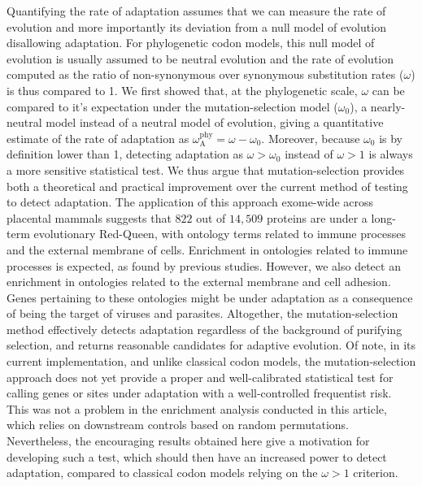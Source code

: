 \documentclass[9pt,twocolumn,twoside,lineno]{pnas-new}
\newcommand{\rateApop}{\omega_{\mathrm{A}}}
\newcommand{\rateAphy}{\rateApop^{\mathrm{phy}}}
\begin{document}
Quantifying the rate of adaptation assumes that we can measure the rate of evolution and more importantly its deviation from a null model of evolution disallowing adaptation.
For phylogenetic codon models, this null model of evolution is usually assumed to be neutral evolution and the rate of evolution computed as the ratio of non-synonymous over synonymous substitution rates ($\omega$) is thus compared to 1.
We first showed that, at the phylogenetic scale, $\omega$ can be compared to it's expectation under the mutation-selection model ($\omega_{0}$), a nearly-neutral model instead of a neutral model of evolution, giving a quantitative estimate of the rate of adaptation as $\rateAphy = \omega - \omega_{0}$.
Moreover, because $\omega_{0}$ is by definition lower than 1\cite{spielman_relationship_2015}, detecting adaptation as $\omega > \omega_{0}$ instead of $\omega > 1$ is always a more sensitive statistical test.
We thus argue that mutation-selection provides both a theoretical and practical improvement over the current method of testing to detect adaptation.
The application of this approach exome-wide across placental mammals suggests that $822$ out of $14,509$ proteins are under a long-term evolutionary Red-Queen, with ontology terms related to immune processes and the external membrane of cells.
Enrichment in ontologies related to immune processes is expected, as found by previous studies\cite{kosiol_patterns_2008}.
However, we also detect an enrichment in ontologies related to the external membrane and cell adhesion.
Genes pertaining to these ontologies might be under adaptation as a consequence of being the target of viruses and parasites\cite{enard_viruses_2016, ebel_high_2017}.
Altogether, the mutation-selection method effectively detects adaptation regardless of the background of purifying selection, and returns reasonable candidates for adaptive evolution.
Of note, in its current implementation, and unlike classical codon models\cite{wong_accuracy_2004, yang_paml_2007}, the mutation-selection approach does not yet provide a proper and well-calibrated statistical test for calling genes or sites under adaptation with a well-controlled frequentist risk.
This was not a problem in the enrichment analysis conducted in this article, which relies on downstream controls based on random permutations.
Nevertheless, the encouraging results obtained here give a motivation for developing such a test, which should then have an increased power to detect adaptation, compared to classical codon models relying on the $\omega > 1$ criterion.
\end{document}
